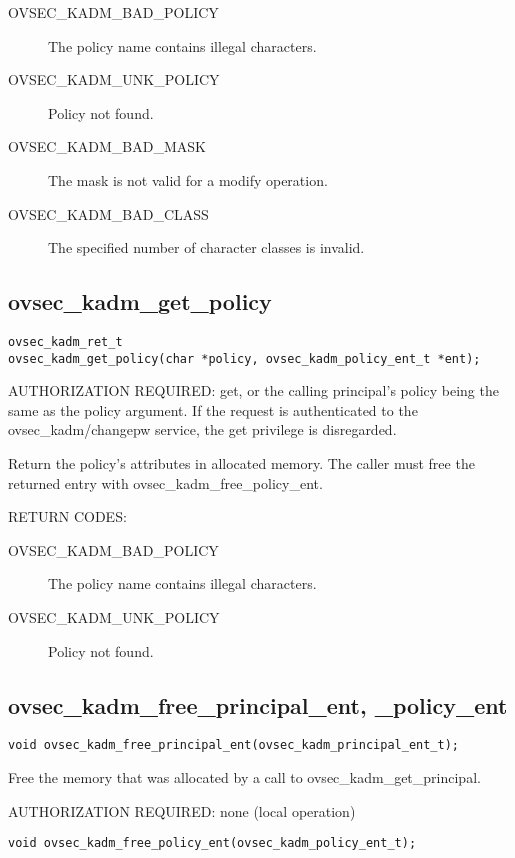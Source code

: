\begin{description}
\item[OVSEC_KADM_BAD_POLICY] The policy name contains illegal characters.
\item[OVSEC_KADM_UNK_POLICY] Policy not found.
\item[OVSEC_KADM_BAD_MASK] The mask is not valid for a modify
operation.
\item[OVSEC_KADM_BAD_CLASS] The specified number of character classes
is invalid.
\end{description}

\subsection{ovsec_kadm_get_policy}

\begin{verbatim}
ovsec_kadm_ret_t
ovsec_kadm_get_policy(char *policy, ovsec_kadm_policy_ent_t *ent); 
\end{verbatim}

AUTHORIZATION REQUIRED: get, or the calling principal's policy being
the same as the policy argument.  If the request is authenticated to
the ovsec_kadm/changepw service, the get privilege is disregarded.

Return the policy's attributes in allocated memory.  The caller must
free the returned entry with ovsec_kadm_free_policy_ent.

RETURN CODES: 

\begin{description}
\item[OVSEC_KADM_BAD_POLICY] The policy name contains illegal characters.
\item[OVSEC_KADM_UNK_POLICY] Policy not found.
\end{description}

\subsection{ovsec_kadm_free_principal_ent, _policy_ent}

\begin{verbatim}
void ovsec_kadm_free_principal_ent(ovsec_kadm_principal_ent_t);
\end{verbatim}

Free the memory that was allocated by a call to
ovsec_kadm_get_principal. 

AUTHORIZATION REQUIRED: none (local operation)

\begin{verbatim}
void ovsec_kadm_free_policy_ent(ovsec_kadm_policy_ent_t);
\end{verbatim}

